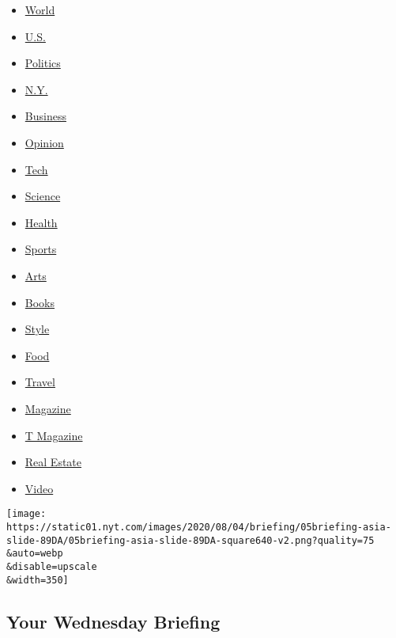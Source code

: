 \begin{itemize}
\tightlist
\item
  \href{https://www.nytimes.com/section/world}{World}
\item
  \href{https://www.nytimes.com/section/us}{U.S.}
\item
  \href{https://www.nytimes.com/section/politics}{Politics}
\item
  \href{https://www.nytimes.com/section/nyregion}{N.Y.}
\item
  \href{https://www.nytimes.com/section/business}{Business}
\item
  \href{https://www.nytimes.com/section/opinion}{Opinion}
\item
  \href{https://www.nytimes.com/section/technology}{Tech}
\item
  \href{https://www.nytimes.com/section/science}{Science}
\item
  \href{https://www.nytimes.com/section/health}{Health}
\item
  \href{https://www.nytimes.com/section/sports}{Sports}
\item
  \href{https://www.nytimes.com/section/arts}{Arts}
\item
  \href{https://www.nytimes.com/section/books}{Books}
\item
  \href{https://www.nytimes.com/section/style}{Style}
\item
  \href{https://www.nytimes.com/section/food}{Food}
\item
  \href{https://www.nytimes.com/section/travel}{Travel}
\item
  \href{https://www.nytimes.com/section/magazine}{Magazine}
\item
  \href{https://www.nytimes.com/section/t-magazine}{T Magazine}
\item
  \href{https://www.nytimes.com/section/realestate}{Real Estate}
\item
  \href{https://www.nytimes.com/video}{Video}
\end{itemize}

\href{/2020/08/05/briefing/beirut-blasts-coronavirus-metoo.html}{}

\texttt{[image: https://static01.nyt.com/images/2020/08/04/briefing/05briefing-asia-slide-89DA/05briefing-asia-slide-89DA-square640-v2.png?quality=75\\\&auto=webp\\\&disable=upscale\\\&width=350]}

\href{/2020/08/05/briefing/beirut-blasts-coronavirus-metoo.html}{}

\hypertarget{your-wednesday-briefing}{%
\subsection{Your Wednesday Briefing}\label{your-wednesday-briefing}}

